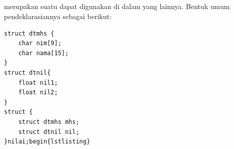\documentclass[../main.tex]{subfiles}
\begin{document}
\subsection{{\Nested} {\Struct}}
{\Nested} {\struct} merupakan suatu {\struct} dapat digunakan di dalam {\struct} yang lainnya. Bentuk umum pendeklarasiannya sebagai berikut:

\begin{code}
\begin{verbatim}
struct dtmhs {
	char nim[9];
	char nama[15];
}
struct dtnil{
	float nil1;
	float nil2;
}
struct {
	struct dtmhs mhs;
	struct dtnil nil;
}nilai;begin{lstlisting}
\end{verbatim}
\end{code}
\end{document}
